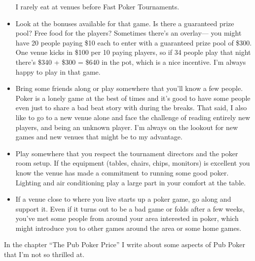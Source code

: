 \begin{itemize}
I rarely eat at venues before Fast Poker Tournaments.


\item Look at the bonuses available for that game. Is there a
guaranteed prize pool? Free food for the players? Sometimes
there's an overlay--- you might have 20 people paying \$10 each
to enter with a guaranteed prize pool of \$300. One venue kicks
in \$100 per 10 paying players, so if 34 people play that night
there's \$340 + \$300 = \$640 in the pot, which is a nice incentive.
I'm always happy to play in that game.

\item Bring some friends along or play somewhere that you'll
know a few people. Poker is a lonely game at the best
of times and it's good to have some people even just to share
a bad beat story with during the breaks. That said, I also like
to go to a new venue alone and face the challenge of
reading entirely new players, and being an unknown player.
I'm always on the lookout for new games and new venues that
might be to my advantage.

\item Play somewhere that you respect the tournament directors
and the poker room setup. If the equipment (tables, chairs, chips,
monitors) is excellent you know the venue has made a commitment
to running some good poker. Lighting and air conditioning
play a large part in your comfort at the table.

\item If a venue close to where you live starts
up a poker game, go along and support it. Even if it turns out to
be a bad game or folds after a few weeks, you've met some people
from around your area interested in poker, which might introduce
you to other games around the area or some home games.

\end{itemize}

In the chapter ``The Pub Poker Price'' I write about some
aspects of Pub Poker that I'm not so thrilled at.
